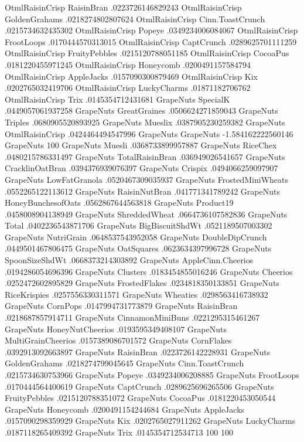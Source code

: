 OtmlRaisinCrisp	RaisinBran	.0223726146829243
OtmlRaisinCrisp	GoldenGrahams	.0218274802807624
OtmlRaisinCrisp	Cinn.ToastCrunch	.0215734632435302
OtmlRaisinCrisp	Popeye	.0349234006084067
OtmlRaisinCrisp	FrootLoops	.0170444570313015
OtmlRaisinCrisp	CaptCrunch	.0289625701111259
OtmlRaisinCrisp	FruityPebbles	.0215120788051185
OtmlRaisinCrisp	CocoaPus	.0181220455971245
OtmlRaisinCrisp	Honeycomb	.0200491157584794
OtmlRaisinCrisp	AppleJacks	.0157090300879469
OtmlRaisinCrisp	Kix	.0202765032419706
OtmlRaisinCrisp	LuckyCharms	.01871182706762
OtmlRaisinCrisp	Trix	.0145354712431681
GrapeNuts	SpecialK	.0449057061937258
GrapeNuts	GreatGraines	.0506624271859043
GrapeNuts	Triples	.0680905520893925
GrapeNuts	Mueslix	.0387905230259382
GrapeNuts	OtmlRaisinCrisp	.0424464494547996
GrapeNuts	GrapeNuts	-1.584162222560146
GrapeNuts	100%
GrapeNuts	Muesli	.0368733899957887
GrapeNuts	RiceChex	.0480215786331497
GrapeNuts	TotalRaisinBran	.036949026541657
GrapeNuts	CracklinOatBran	.0394376939076397
GrapeNuts	Crispix	.0494066259097907
GrapeNuts	LowFatGranola	.0520467309035937
GrapeNuts	FrostedMiniWheats	.0552265122113612
GrapeNuts	RaisinNutBran	.041771341789242
GrapeNuts	HoneyBunchesofOats	.0562867644563818
GrapeNuts	Product19	.0458008904138949
GrapeNuts	ShreddedWheat	.0664736107582836
GrapeNuts	Total	.0402236543871706
GrapeNuts	BigBiscuitShdWt	.0521189507003302
GrapeNuts	NutriGrain	.0648537543952058
GrapeNuts	DoubleDipCrunch	.0449501467806475
GrapeNuts	OatSquares	.0623634397996728
GrapeNuts	SpoonSizeShdWt	.0668373214303892
GrapeNuts	AppleCinn.Cheerios	.0194286054696396
GrapeNuts	Clusters	.0183454855016246
GrapeNuts	Cheerios	.0252472602895829
GrapeNuts	FrostedFlakes	.0234818350133851
GrapeNuts	RiceKrispies	.0257556330311571
GrapeNuts	Wheaties	.0298563416738932
GrapeNuts	CornPops	.0147994731773879
GrapeNuts	RaisinBran	.0218687857914711
GrapeNuts	CinnamonMiniBuns	.0221295315461267
GrapeNuts	HoneyNutCheerios	.0193595349408107
GrapeNuts	MultiGrainCheerios	.0157389086701572
GrapeNuts	CornFlakes	.0392913092663897
GrapeNuts	RaisinBran	.0223726142228931
GrapeNuts	GoldenGrahams	.0218274799045645
GrapeNuts	Cinn.ToastCrunch	.0215734630753966
GrapeNuts	Popeye	.0349234006208885
GrapeNuts	FrootLoops	.0170444564400619
GrapeNuts	CaptCrunch	.0289625696265506
GrapeNuts	FruityPebbles	.0215120788351072
GrapeNuts	CocoaPus	.0181220453050544
GrapeNuts	Honeycomb	.0200491154244684
GrapeNuts	AppleJacks	.0157090298359929
GrapeNuts	Kix	.0202765027911262
GrapeNuts	LuckyCharms	.0187118265409392
GrapeNuts	Trix	.0145354712534713
100%
100%
